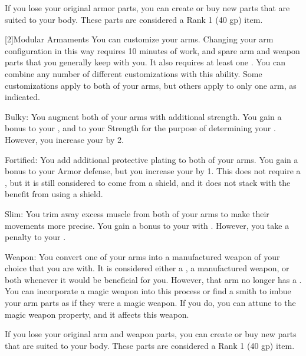       If you lose your original armor parts, you can create or buy new parts that are suited to your body.
      These parts are considered a Rank 1 (40 gp) item.

    [2]{Modular Armaments} You can customize your arms.
      Changing your arm configuration in this way requires 10 minutes of work, and spare arm and weapon parts that you generally keep with you.
      It also requires at least one .
      You can combine any number of different customizations with this ability.
      Some customizations apply to both of your arms, but others apply to only one arm, as indicated.
      \begin{raggeditemize}
        \item Bulky: You augment both of your arms with additional strength.
          You gain a  bonus to your , and to your Strength for the purpose of determining your .
          However, you increase your  by 2.
        \item Fortified: You add additional protective plating to both of your arms.
          You gain a  bonus to your Armor defense, but you increase your  by 1.
          This does not require a , but it is still considered to come from a shield, and it does not stack with the benefit from using a shield.
        \item Slim: You trim away excess muscle from both of your arms to make their movements more precise.
          You gain a  bonus to your  with .
          However, you take a  penalty to your .
        \item Weapon: You convert one of your arms into a manufactured weapon of your choice that you are  with.
          It is considered either a , a manufactured weapon, or both whenever it would be beneficial for you.
          However, that arm no longer has a .
          You can incorporate a magic weapon into this process or find a smith to imbue your arm parts as if they were a magic weapon.
          If you do, you can attune to the magic weapon property, and it affects this weapon.
      \end{raggeditemize}

      If you lose your original arm and weapon parts, you can create or buy new parts that are suited to your body.
      These parts are considered a Rank 1 (40 gp) item.

